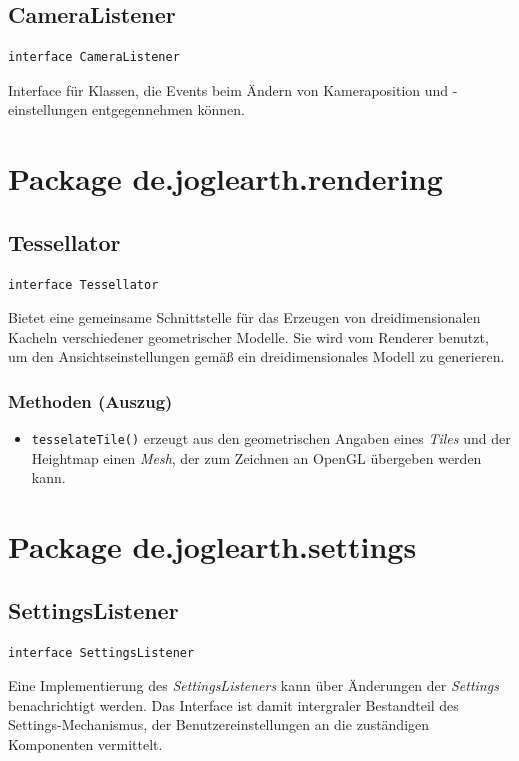 \documentclass[10pt]{scrreprt}
\begin{document}
\vspace{5mm}
\subsection*{CameraListener}
\begin{lstlisting}
interface CameraListener
\end{lstlisting}
Interface für Klassen, die Events beim Ändern von Kameraposition und -einstellungen entgegennehmen können.\\

\pagebreak
\vspace{5mm}
\section{Package de.joglearth.rendering}
\subsection*{Tessellator}
\begin{lstlisting}
interface Tessellator
\end{lstlisting}
Bietet eine gemeinsame Schnittstelle für das Erzeugen von dreidimensionalen Kacheln verschiedener geometrischer Modelle. Sie wird vom Renderer benutzt, um den Ansichtseinstellungen gemäß ein dreidimensionales Modell zu generieren.\\
\subsubsection*{Methoden (Auszug)}
\begin{itemize}
\item \texttt{tesselateTile()} erzeugt aus den geometrischen Angaben eines \textit{Tiles} und der Heightmap einen \textit{Mesh}, der zum Zeichnen an OpenGL übergeben werden kann.
\end{itemize}


\vspace{5mm}
\section{Package de.joglearth.settings}
\subsection*{SettingsListener}
\begin{lstlisting}
interface SettingsListener
\end{lstlisting}
Eine Implementierung des \textit{SettingsListeners} kann über Änderungen der \textit{Settings} benachrichtigt werden. Das Interface ist damit intergraler Bestandteil des Settings-Mechanismus, der Benutzereinstellungen an die zuständigen Komponenten vermittelt.\\
\end{document}

